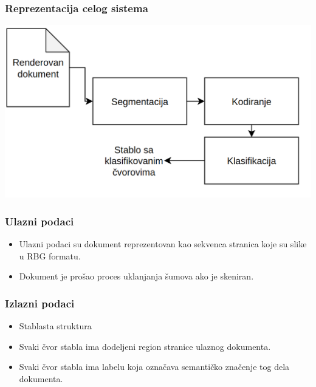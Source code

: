 \documentclass{beamer}
\begin{document}
\begin{frame}
	\frametitle{Reprezentacija celog sistema}
	\includegraphics[width=\textwidth]{./png/system.png}
\end{frame}

\begin{frame}
	\frametitle{Ulazni podaci}
	\begin{itemize}
		\item Ulazni podaci su dokument reprezentovan kao sekvenca stranica koje su slike u RBG formatu.
		\item Dokument je prošao proces uklanjanja šumova ako je skeniran. 
	\end{itemize}
\end{frame}


\begin{frame}
	\frametitle{Izlazni podaci}
	\begin{itemize}
		\item Stablasta struktura
		\item Svaki čvor stabla ima dodeljeni region stranice ulaznog dokumenta. 
		\item Svaki čvor stabla ima labelu koja označava semantičko značenje tog dela dokumenta. 
	\end{itemize}
\end{frame}
\end{document}
